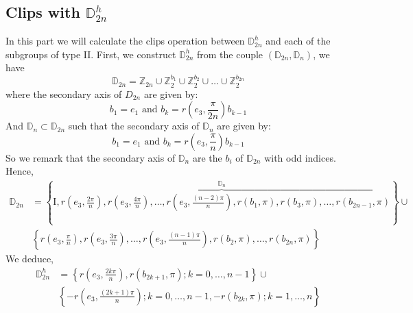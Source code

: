 \documentclass[11pt,a4paper]{amsart}
\theoremstyle{definition}
\newcommand{\ZZ}{\mathbb{Z}}                %
\newcommand{\DD}{\mathbb{D}}                %
\newcommand{\1}{\mathds{1}}		            %
\newcommand{\id}{\mathrm{I}}                %
\newcommand{\set}[1]{\left\{#1\right\}}     %
\begin{document}
\subsection{Clips with $\DD_{2n}^h$}
\par In this part we will calculate the clips operation between $\DD_{2n}^h$ and each of the subgroups of type II. First, we construct $\DD_{2n}^h$ from the couple $(\DD_{2n},\DD_n)$, we have
\begin{equation*}
\DD_{2n}=\ZZ_{2n}\cup \ZZ_2^{b_1} \cup \ZZ_2^{b_2} \cup \dotsc \cup \ZZ_2^{b_{2n}}
\end{equation*}
where the secondary axis of $D_{2n}$ are given by:
\begin{equation*}
b_1=e_1 \text{ and } b_k=r(e_3,\frac{\pi}{2n})b_{k-1}
\end{equation*}
And $\DD_n\subset \DD_{2n}$ such that the secondary axis of $\DD_n$ are given by:
\begin{equation*}
b_1=e_1 \text{ and } b_k=r(e_3,\frac{\pi}{n})b_{k-1}
\end{equation*}
So we remark that the secondary axis of $\DD_n$ are the $b_i$ of $\DD_{2n}$ with odd indices.
Hence,
\begin{align*}
\DD_{2n}&=\displaystyle \set{\overbrace{\id,r(e_3,\frac{2\pi}{n}),
r(e_3,\frac{4\pi}{n}),\dotsc,r(e_3,\frac{(n-2)\pi}{n}),r(b_1,\pi),r(b_3,\pi),\dotsc,r(b_{2n-1},\pi)}^{\DD_n}}\cup \\ & \set{r(e_3,\frac{\pi}{n}),r(e_3,\frac{3\pi}{n}),\dotsc,r(e_3,\frac{(n-1)\pi}{n}),r(b_2,\pi),\dotsc,r(b_{2n},\pi)}
\end{align*}
We deduce,
\begin{align*}
\DD_{2n}^h&=\set{r(e_3,\frac{2k\pi}{n}),r(b_{2k+1},\pi);k=0,\dotsc,n-1}\cup\\
          &\set{-r(e_3,\frac{(2k+1)\pi}{n});k=0,\dotsc,n-1,-r(b_{2k},\pi);k=1,\dotsc,n}
\end{align*}
\end{document}
